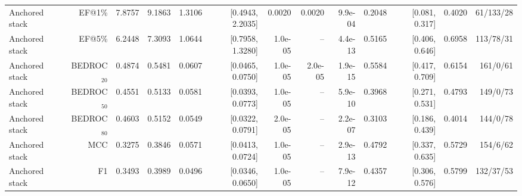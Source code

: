 \begin{table}[t]
\begin{tabular}{lrrrrrrrrrrrr}
Anchored stack & EF@1\% & 7.8757 & 9.1863 & 1.3106 & [0.4943, 2.2035] & 0.0020 & 0.0020 & 9.9e-04 & 0.2048 & [0.081, 0.317] & 0.4020 & 61/133/28 \\
Anchored stack & EF@5\% & 6.2448 & 7.3093 & 1.0644 & [0.7958, 1.3280] & 1.0e-05 & -- & 4.4e-13 & 0.5165 & [0.406, 0.646] & 0.6958 & 113/78/31 \\
Anchored stack & BEDROC$_{20}$ & 0.4874 & 0.5481 & 0.0607 & [0.0465, 0.0750] & 1.0e-05 & 2.0e-05 & 1.9e-15 & 0.5584 & [0.417, 0.709] & 0.6154 & 161/0/61 \\
Anchored stack & BEDROC$_{50}$ & 0.4551 & 0.5133 & 0.0581 & [0.0393, 0.0773] & 1.0e-05 & -- & 5.9e-10 & 0.3968 & [0.271, 0.531] & 0.4793 & 149/0/73 \\
Anchored stack & BEDROC$_{80}$ & 0.4603 & 0.5152 & 0.0549 & [0.0322, 0.0791] & 2.0e-05 & -- & 2.2e-07 & 0.3103 & [0.186, 0.439] & 0.4014 & 144/0/78 \\
Anchored stack & MCC & 0.3275 & 0.3846 & 0.0571 & [0.0413, 0.0724] & 1.0e-05 & -- & 2.9e-13 & 0.4792 & [0.337, 0.635] & 0.5729 & 154/6/62 \\
Anchored stack & F1 & 0.3493 & 0.3989 & 0.0496 & [0.0346, 0.0650] & 1.0e-05 & -- & 7.9e-12 & 0.4357 & [0.306, 0.576] & 0.5799 & 132/37/53 \\
\bottomrule
\end{tabular}
\end{table}
